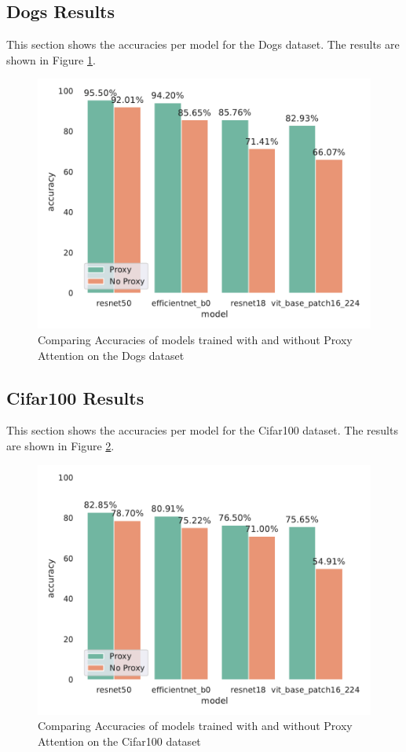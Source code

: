 \subsection{Dogs Results}
This section shows the accuracies per model for the Dogs dataset. The results are shown in Figure \ref{fig:dogs_results}. 
\begin{figure}[H]
    \centering
    \includegraphics[width=1\textwidth]{results/dogs_results.pdf}
    \caption{Comparing Accuracies of models trained with and without Proxy Attention on the Dogs dataset}
    \label{fig:dogs_results}
\end{figure}

\subsection{Cifar100 Results}
This section shows the accuracies per model for the Cifar100 dataset. The results are shown in Figure \ref{fig:cifar100_results}. 
\begin{figure}[H]
    \centering
    \includegraphics[width=1\textwidth]{results/cifar100_results.pdf}
    \caption{Comparing Accuracies of models trained with and without Proxy Attention on the Cifar100 dataset}
    \label{fig:cifar100_results}
\end{figure}

